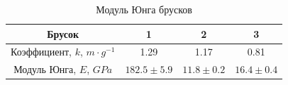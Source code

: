 \documentclass[14pt, a4paper]{article}
\begin{document}
\begin{table}[!h]
\centering
\begin{tabular}{| c | c | c | c |}

\hline
Брусок & 1 & 2 & 3 \\
\hline
Коэффициент, $k$, $m\cdot g^{-1}$ & 1.29 & 1.17 & 0.81 \\
\hline
Модуль Юнга, $E$, $GPa$ & $182.5\pm 5.9$ & $11.8\pm0.2$ & $16.4\pm 0.4$ \\
\hline

\end{tabular}
\label{table6}
\caption{Модуль Юнга брусков}
\end{table}
\end{document}
